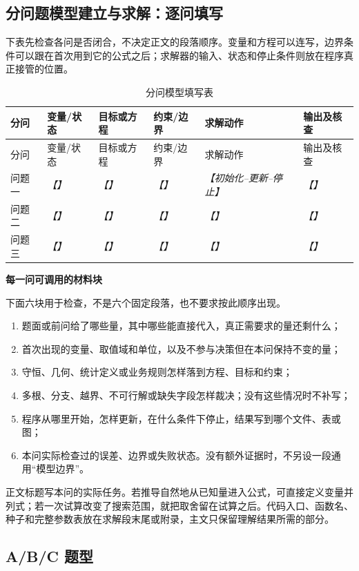 \documentclass[UTF8,zihao=-4]{ctexart}
\newcommand{\slot}[1]{\textcolor{inkblue}{\textit{【#1】}}}
\newcommand{\guidehead}[1]{\par\medskip\noindent\textbf{\color{inkblue}#1}\par}
\begin{document}
\subsection{分问题模型建立与求解：逐问填写}

下表先检查各问是否闭合，不决定正文的段落顺序。变量和方程可以连写，边界条件可以跟在首次用到它的公式之后；求解器的输入、状态和停止条件则放在程序真正接管的位置。

\begin{longtable}{p{1.8cm}p{2.4cm}p{2.7cm}p{2.7cm}p{2.8cm}p{2.1cm}}
\caption{分问模型填写表}\label{tab:template-model-card}\\
\toprule
分问 & 变量/状态 & 目标或方程 & 约束/边界 & 求解动作 & 输出及核查\\
\midrule
\endfirsthead
\toprule
分问 & 变量/状态 & 目标或方程 & 约束/边界 & 求解动作 & 输出及核查\\
\midrule
\endhead
问题一 & \slot{} & \slot{} & \slot{} & \slot{初始化--更新--停止} & \slot{}\\
问题二 & \slot{} & \slot{} & \slot{} & \slot{} & \slot{}\\
问题三 & \slot{} & \slot{} & \slot{} & \slot{} & \slot{}\\
\bottomrule
\end{longtable}

\guidehead{每一问可调用的材料块}下面六块用于检查，不是六个固定段落，也不要求按此顺序出现。
\begin{enumerate}
  \item 题面或前问给了哪些量，其中哪些能直接代入，真正需要求的量还剩什么；
  \item 首次出现的变量、取值域和单位，以及不参与决策但在本问保持不变的量；
  \item 守恒、几何、统计定义或业务规则怎样落到方程、目标和约束；
  \item 多根、分支、越界、不可行解或缺失字段怎样裁决；没有这些情况时不补写；
  \item 程序从哪里开始，怎样更新，在什么条件下停止，结果写到哪个文件、表或图；
  \item 本问实际检查过的误差、边界或失败状态。没有额外证据时，不另设一段通用“模型边界”。
\end{enumerate}
正文标题写本问的实际任务。若推导自然地从已知量进入公式，可直接定义变量并列式；若一次试算改变了搜索范围，就把取舍留在试算之后。代码入口、函数名、种子和完整参数表放在求解段末尾或附录，主文只保留理解结果所需的部分。

\subsection{A/B/C 题型}
\end{document}
